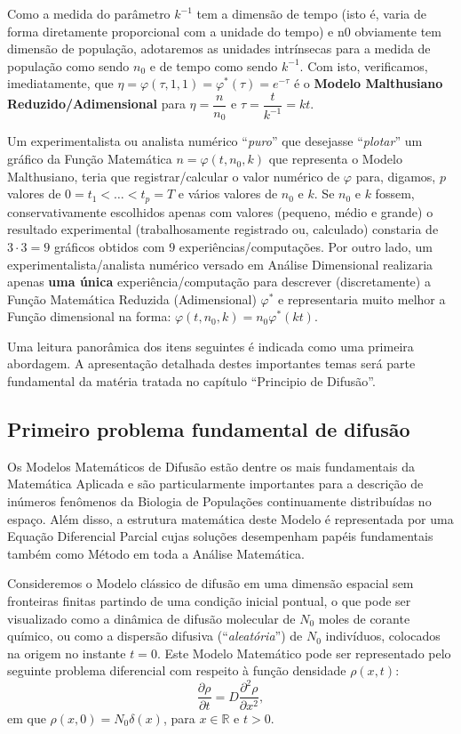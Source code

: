     Como a medida do parâmetro \(k^{-1}\) tem a dimensão de tempo (isto é, varia de forma diretamente proporcional com a unidade do tempo) e n0 obviamente tem dimensão de população, adotaremos as unidades intrínsecas para a medida de população como sendo \(n_0\) e de tempo como sendo \(k^{-1}\). Com isto, verificamos, imediatamente, que \(\eta = \varphi(\tau, 1, 1) = \varphi^\ast(\tau) = e^{-\tau}\) é o \textbf{Modelo Malthusiano Reduzido/Adimensional} para \(\eta = \dfrac{n}{n_0}\) e \(\tau = \dfrac{t}{k^{-1}} = kt\).

    Um experimentalista ou analista numérico ``\textit{puro}'' que desejasse ``\textit{plotar}'' um gráfico da Função Matemática \(n = \varphi(t, n_0, k)\) que representa o Modelo Malthusiano, teria que registrar/calcular o valor numérico de \(\varphi\) para, digamos, \(p\) valores de \(0 = t_{1} < \ldots < t_{p} = T\) e vários valores de \(n_0\) e \(k\). Se \(n_0\) e \(k\) fossem, conservativamente escolhidos apenas com valores (pequeno, médio e grande) o resultado experimental (trabalhosamente registrado ou, calculado) constaria de \(3 \cdot 3 = 9\) gráficos obtidos com \(9\) experiências/computações. Por outro lado, um experimentalista/analista numérico versado em Análise Dimensional realizaria apenas \textbf{uma única} experiência/computação para descrever (discretamente) a Função Matemática Reduzida (Adimensional) \(\varphi^\ast\) e representaria muito melhor a Função dimensional na forma: \(\varphi(t, n_{0}, k) = n_{0} \varphi^\ast(kt)\).

    Uma leitura panorâmica dos itens seguintes é indicada como uma primeira abordagem. A apresentação detalhada destes importantes temas será parte fundamental da matéria tratada no capítulo ``Principio de Difusão''.



\subsection{Primeiro problema fundamental de difusão}

    Os Modelos Matemáticos de Difusão estão dentre os mais fundamentais da Matemática Aplicada e são particularmente importantes para a descrição de inúmeros fenômenos da Biologia de Populações continuamente distribuídas no espaço. Além disso, a estrutura matemática deste Modelo é representada por uma Equação Diferencial Parcial cujas soluções desempenham papéis fundamentais também como Método em toda a Análise Matemática.

    Consideremos o Modelo clássico de difusão em uma dimensão espacial sem fronteiras finitas partindo de uma condição inicial pontual, o que pode ser visualizado como a dinâmica de difusão molecular de \(N_0\) moles de corante químico, ou como a dispersão difusiva (``\textit{aleatória}'') de \(N_0\) indivíduos, colocados na origem no instante \(t = 0\). Este Modelo Matemático pode ser representado pelo seguinte problema diferencial com respeito à função densidade \(\rho(x, t)\):
    \[\dfrac{\partial \rho}{\partial t} = D \dfrac{\partial^2 \rho}{\partial x^2},\] em que
    \(\rho(x, 0) = N_0 \delta(x)\), para \(x \in \mathbb{R} \mbox{ e } t > 0.\)

